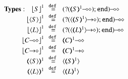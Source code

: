 \begin{figure}[t]
\[
\begin{array}{rcll}
	\noindent{\bf Types:} \quad 
	\vtmap{{S}}{1}	&\!\!\defeq\!\!&	\lhot{(\btinp{\lhot{\tmap{S}{1}}} \tinact)} \\
	\vtmap{\chtype{S}}{1}&\!\!\defeq\!\!&	\lhot{(\btinp{\shot{\chtype{\tmap{S}{1}}}} \tinact)}  \\
	\vtmap{\chtype{L}}{1}&\!\!\defeq\!\!&	\lhot{(\btinp{\shot{\chtype{\tmap{L}{1}}}} \tinact)} \\
	\vtmap{\lhot{C}}{1} &\!\!\defeq\!\!& \lhot{\tmap{C}{1}}\\
	\vtmap{\shot{C}}{1} &\!\!\defeq\!\!& \shot{\tmap{C}{1}}\\
	\tmap{\chtype{S}}{1}&\!\!\defeq\!\!&	\chtype{\tmap{S}{1}}  \\
	\tmap{\chtype{L}}{1}&\!\!\defeq\!\!&	\chtype{\tmap{L}{1}}  \\


\end{array}\]
\end{figure}
